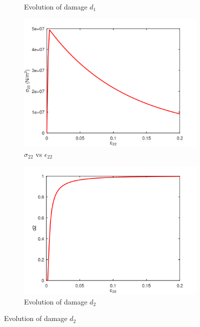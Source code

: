 \documentclass[a4paper,12pt]{extarticle}
\begin{document}
\begin{figure}[htbp]
\begin{subfigure}{0.45\textwidth}
         \caption{Evolution of damage $d_{1}$}
         \label{fig:Evolution of damage d1 2}
     \end{subfigure}
     \vfill
     \begin{subfigure}{0.45\textwidth}
         \centering
         \includegraphics[width=1.25\textwidth]{24.S22vsE22.png}
         \caption{$\sigma_{22}$ vs $\epsilon_{22}$}
         \label{fig:S22vsE22 2}
     \end{subfigure}   
     \hfill
     \begin{subfigure}{0.45\textwidth}
         \centering
         \includegraphics[width=1.25\textwidth]{24.d2.png}
         \caption{Evolution of damage $d_{2}$}
         \label{fig:Evolution of damage d2 2}
     \end{subfigure}
\end{figure}
\end{document}

